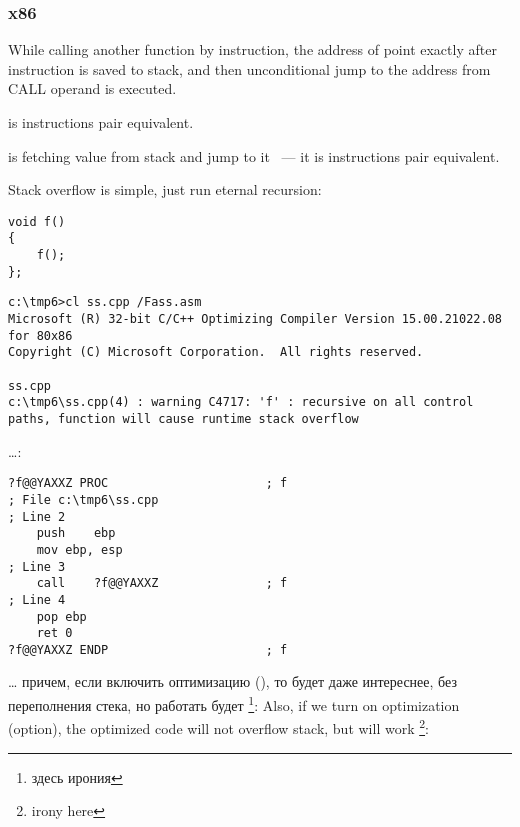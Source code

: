 \subsubsection{x86}

{While calling another function by \CALL instruction, the address of point exactly after \CALL instruction is saved 
to stack, and then unconditional jump to the address from CALL operand is executed.} 

{\CALL is  instructions pair equivalent}.

{\RET is fetching value from stack and jump to it ~--- it is  instructions pair equivalent.}

{Stack overflow is simple, just run eternal recursion:}

\begin{lstlisting}
void f()
{
	f();
};
\end{lstlisting}


\begin{lstlisting}
c:\tmp6>cl ss.cpp /Fass.asm
Microsoft (R) 32-bit C/C++ Optimizing Compiler Version 15.00.21022.08 for 80x86
Copyright (C) Microsoft Corporation.  All rights reserved.

ss.cpp
c:\tmp6\ss.cpp(4) : warning C4717: 'f' : recursive on all control paths, function will cause runtime stack overflow
\end{lstlisting}

\dots {}:

\begin{lstlisting}
?f@@YAXXZ PROC						; f
; File c:\tmp6\ss.cpp
; Line 2
	push	ebp
	mov	ebp, esp
; Line 3
	call	?f@@YAXXZ				; f
; Line 4
	pop	ebp
	ret	0
?f@@YAXXZ ENDP						; f
\end{lstlisting}

\dots \IFRU
{причем, если включить оптимизацию (\Ox), то будет даже интереснее, без переполнения стека, 
но работать будет \footnote{здесь ирония}:}
{Also, if we turn on optimization (\Ox option), the optimized code will not overflow stack, 
but will work \footnote{irony here}:}

